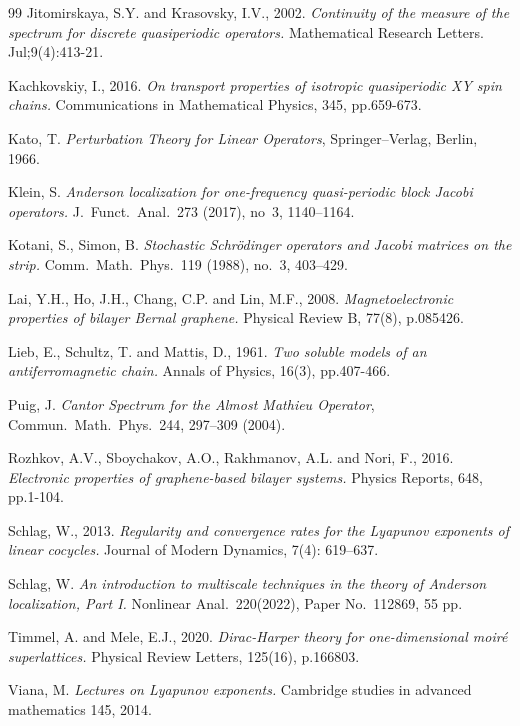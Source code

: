 \documentclass[11pt]{amsart}
\begin{document}
\begin{thebibliography}{99}
 Jitomirskaya, S.Y. and Krasovsky, I.V., 2002. {\em Continuity of the measure of the spectrum for discrete quasiperiodic operators.} Mathematical Research Letters. Jul;9(4):413-21.

Kachkovskiy, I., 2016. {\em On transport properties of isotropic quasiperiodic XY spin chains.} Communications in Mathematical Physics, 345, pp.659-673.

 Kato, T. {\em Perturbation Theory for Linear Operators}, Springer–Verlag, Berlin, 1966. 

 Klein, S. {\em 
Anderson localization for one-frequency quasi-periodic block Jacobi operators.}  J.\ Funct.\ Anal.~273 (2017), no~3, 1140--1164.

 Kotani, S., Simon, B. {\em 
Stochastic Schr\"odinger operators and Jacobi matrices on the strip.} Comm.\ Math.\ Phys.\ 119 (1988), no.~3, 403--429.

Lai, Y.H., Ho, J.H., Chang, C.P. and Lin, M.F., 2008. {\em Magnetoelectronic properties of bilayer Bernal graphene.} Physical Review B, 77(8), p.085426.

Lieb, E., Schultz, T. and Mattis, D., 1961. {\em Two soluble models of an antiferromagnetic chain.} Annals of Physics, 16(3), pp.407-466.

 Puig, J. {\em Cantor Spectrum for the Almost Mathieu Operator}, Commun.\ Math.\ Phys.\ 244, 297--309 (2004). 

 Rozhkov, A.V., Sboychakov, A.O., Rakhmanov, A.L. and Nori, F., 2016. {\em Electronic properties of graphene-based bilayer systems.} Physics Reports, 648, pp.1-104.


 Schlag, W., 2013. {\em Regularity and convergence rates for the Lyapunov exponents of linear cocycles.} Journal of Modern Dynamics,  7(4): 619--637.

 Schlag, W. {\em 
An introduction to multiscale techniques in the theory of Anderson localization, Part I.}
Nonlinear Anal.~220(2022), Paper No.~112869, 55 pp.

 Timmel, A. and Mele, E.J., 2020. {\em Dirac-Harper theory for one-dimensional moiré superlattices.} Physical Review Letters, 125(16), p.166803.

 Viana, M. {\em Lectures on Lyapunov exponents.} Cambridge studies in advanced mathematics 145, 2014. 
 
\end{thebibliography}
\end{document}
